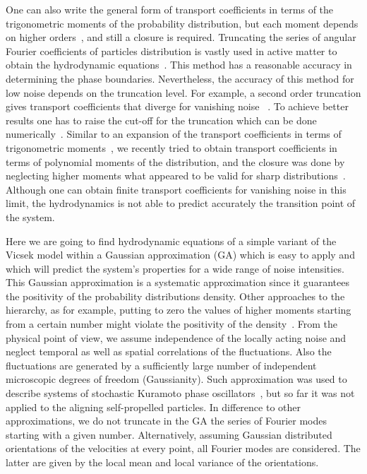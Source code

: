 \documentclass[reprint,floatfix,amsmath,amssymb,aps,pre,showkeys,showpacs,superscriptaddress]{revtex4-1}
\newcommand{\hl}[1]{\textcolor{hlcolor}{#1}}
\begin{document}
One can also write the general form of transport coefficients in terms of the trigonometric moments of the \hl{probability} distribution, but each moment depends on higher orders~\cite{romanczuk2012swarming,romanczuk2012mean,Grossmann2012}, and still a closure is required. Truncating the \hl{series of} angular Fourier coefficients of particles distribution is vastly used in active matter to obtain \hl{the hydrodynamic equations}~\cite{Farrell2012,Grossmann2014,Yang2015,allaei2016}. This method has a reasonable accuracy in determining the phase boundaries. Nevertheless, the accuracy of this method for low noise depends on the truncation level. For example, a second order truncation gives transport coefficients that diverge \hl{for vanishing noise }~\cite{Farrell2012,allaei2016,Yang2015}. To achieve better results one has to raise the cut-off for the truncation which can be done numerically~\cite{Grossmann2013}. Similar to \hl{an} expansion of the transport coefficients in terms of trigonometric moments~\cite{romanczuk2012swarming,romanczuk2012mean,Grossmann2012}, we recently tried to obtain transport coefficients in terms of polynomial moments of the distribution, and the closure \hl{was} done by neglecting higher moments \hl{what appeared to be} valid for sharp distributions~\cite{allaei2016}. Although one can obtain finite transport coefficients \hl{for vanishing} noise in this limit, the hydrodynamics is not able to predict \hl{accurately} the transition point of the system.

Here we are going to find \hl{hydrodynamic equations} \hl{of a simple variant of the Vicsek model within a}  Gaussian approximation (GA) which is easy to apply and \hl{which will predict the system's properties for a wide range of noise intensities.} \hl{This Gaussian approximation is a systematic approximation since it guarantees the positivity of the probability distributions density. Other approaches to  the hierarchy,  as for example, putting to zero the values of higher moments starting from a certain number might violate the positivity of the density~\cite{Hanggi1980}. From the physical point of view, we assume independence of the locally acting noise and neglect temporal as well as spatial correlations of the fluctuations. Also the fluctuations are generated by a sufficiently large number of independent microscopic degrees of freedom (Gaussianity).} Such approximation was used to describe systems of stochastic Kuramoto phase oscillators~\cite{sonnenschein2013approximate,sonnenschein2013excitable,sonnenschein2014cooperative,Sonnenschein2015}, but so far  it  was not applied to the aligning self-propelled particles. In difference to other approximations\hl{,} we do not truncate in the GA the series of Fourier modes starting with a given number. Alternatively, assuming Gaussian distributed orientations of the velocities at every point, all Fourier modes are \hl{considered. The latter are} given by the local mean and local variance of the orientations.
\end{document}
